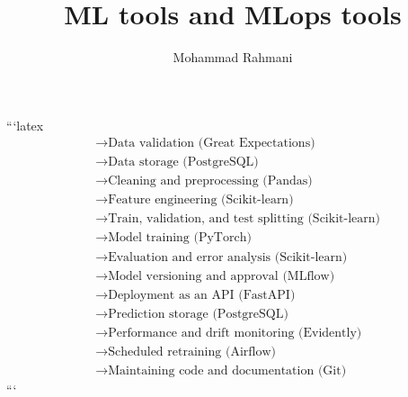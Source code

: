 \documentclass[a4paper]{article}
\title{ML tools and MLops tools}
\date{}
\author{Mohammad Rahmani}
\begin{document}
    \maketitle
    ```latex
    \begin{align*}
        &\longrightarrow \text{Data validation (Great Expectations)} \\
        &\longrightarrow \text{Data storage (PostgreSQL)} \\
        &\longrightarrow \text{Cleaning and preprocessing (Pandas)} \\
        &\longrightarrow \text{Feature engineering (Scikit-learn)} \\
        &\longrightarrow \text{Train, validation, and test splitting (Scikit-learn)} \\
        &\longrightarrow \text{Model training (PyTorch)} \\
        &\longrightarrow \text{Evaluation and error analysis (Scikit-learn)} \\
        &\longrightarrow \text{Model versioning and approval (MLflow)} \\
        &\longrightarrow \text{Deployment as an API (FastAPI)} \\
        &\longrightarrow \text{Prediction storage (PostgreSQL)} \\
        &\longrightarrow \text{Performance and drift monitoring (Evidently)} \\
        &\longrightarrow \text{Scheduled retraining (Airflow)} \\
        &\longrightarrow \text{Maintaining code and documentation (Git)}
    \end{align*}
    ```
    
%    
%    
\end{document}
